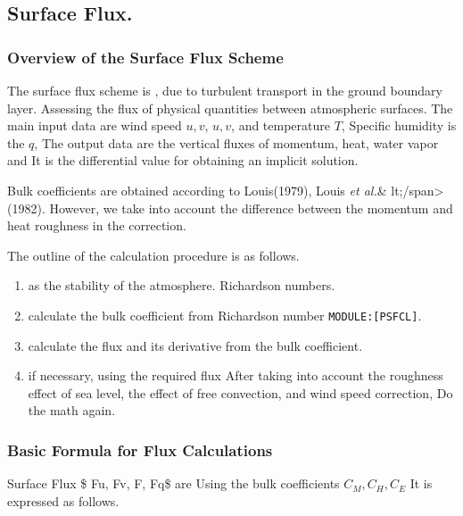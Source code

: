 \hypertarget{surface-flux.}{%
\subsection{Surface Flux.}\label{surface-flux.}}

\hypertarget{overview-of-the-surface-flux-scheme}{%
\subsubsection{Overview of the Surface Flux
Scheme}\label{overview-of-the-surface-flux-scheme}}

The surface flux scheme is , due to turbulent transport in the ground
boundary layer. Assessing the flux of physical quantities between
atmospheric surfaces. The main input data are wind speed \(u, v\),
\(u, v\), and temperature \(T\), Specific humidity is the \(q\), The
output data are the vertical fluxes of momentum, heat, water vapor and
It is the differential value for obtaining an implicit solution.

Bulk coefficients are obtained according to Louis(1979), Louis \emph{et
al.}\& lt;/span\textgreater(1982). However, we take into account the
difference between the momentum and heat roughness in the correction.

The outline of the calculation procedure is as follows.

\begin{enumerate}
\def\labelenumi{\arabic{enumi}.}
\item
  as the stability of the atmosphere. Richardson numbers.
\item
  calculate the bulk coefficient from Richardson number
  \texttt{MODULE:{[}PSFCL{]}}.
\item
  calculate the flux and its derivative from the bulk coefficient.
\item
  if necessary, using the required flux After taking into account the
  roughness effect of sea level, the effect of free convection, and wind
  speed correction, Do the math again.
\end{enumerate}

\hypertarget{basic-formula-for-flux-calculations}{%
\subsubsection{Basic Formula for Flux
Calculations}\label{basic-formula-for-flux-calculations}}

Surface Flux \$ Fu, Fv, F\theta, Fq\$ are Using the bulk coefficients
\(C_M, C_H, C_E\) It is expressed as follows.

